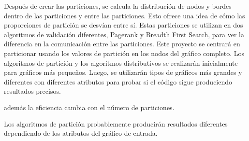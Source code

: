 Después de crear las particiones, se calcula la distribución de nodos y bordes dentro de las particiones y entre las particiones. Esto ofrece una idea de cómo las proporciones de partición se desvían entre sí. Estas particiones se utilizan en dos algoritmos de validación diferentes, Pagerank y Breadth First Search, para ver la diferencia en la comunicación entre las particiones.
Este proyecto se centrará en particionar usando los valores de partición en los nodos del gráfico completo.
Los algoritmos de partición y los algoritmos distributivos se realizarán inicialmente para gráficos más pequeños. Luego, se utilizarán tipos de gráficos más grandes y diferentes con diferentes atributos para probar si el código
sigue produciendo resultados precisos.

además la eficiencia cambia con el número de particiones.

Los algoritmos de partición probablemente producirán resultados diferentes dependiendo de los atributos del gráfico de entrada.
